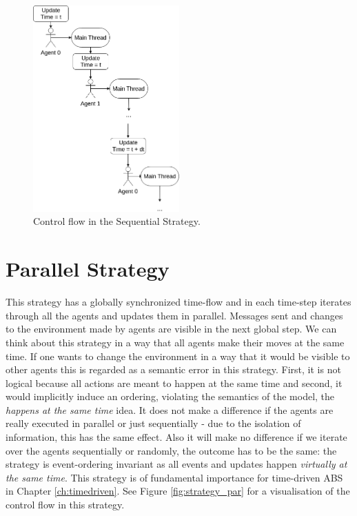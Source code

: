 \begin{figure}[H]
	\centering
	\includegraphics[width=0.5\textwidth, angle=0]{./fig/implabs/sequential.png}
	\caption{Control flow in the Sequential Strategy.}
	\label{fig:strategy_seq}
\end{figure}

\section{Parallel Strategy}
\label{sub:par_strategy}

This strategy has a globally synchronized time-flow and in each time-step iterates through all the agents and updates them in parallel. Messages sent and changes to the environment made by agents are visible in the next global step. We can think about this strategy in a way that all agents make their moves at the same time.  If one wants to change the environment in a way that it would be visible to other agents this is regarded as a semantic error in this strategy. First, it is not logical because all actions are meant to happen at the same time and second, it would implicitly induce an ordering, violating the semantics of the model, the \textit{happens at the same time} idea.
It does not make a difference if the agents are really executed in parallel or just sequentially - due to the isolation of information, this has the same effect. Also it will make no difference if we iterate over the agents sequentially or randomly, the outcome has to be the same: the strategy is event-ordering invariant as all events and updates happen \textit{virtually at the same time}. This strategy is of fundamental importance for time-driven ABS in Chapter \ref{ch:timedriven}. See Figure \ref{fig:strategy_par} for a visualisation of the control flow in this strategy.

